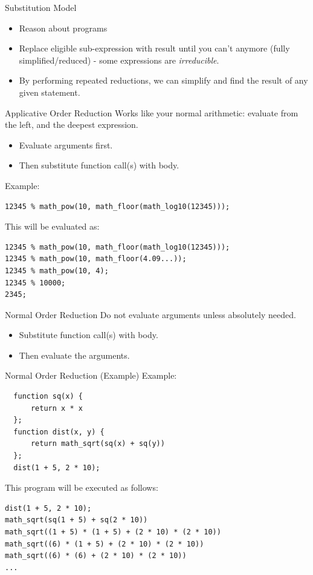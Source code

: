 \documentclass[10pt]{beamer}
\begin{document}
\begin{frame}[fragile]{Substitution Model}
  \begin{itemize}
    \item Reason about programs
    \item Replace eligible sub-expression with result until you can't anymore (fully simplified/reduced) - some expressions are \textit{irreducible}.
    \item By performing repeated reductions, we can simplify and find the result of any given statement.
  \end{itemize}  
\end{frame}

\begin{frame}[fragile]{Applicative Order Reduction}
  Works like your normal arithmetic: evaluate from the left, and the deepest expression.
  \begin{itemize}
    \item Evaluate arguments first.
    \item Then substitute function call(s) with body.
  \end{itemize}
  Example:
  \begin{verbatim}      
12345 % math_pow(10, math_floor(math_log10(12345)));
  \end{verbatim}   
  This will be evaluated as:
  \begin{verbatim}
12345 % math_pow(10, math_floor(math_log10(12345)));
12345 % math_pow(10, math_floor(4.09...));
12345 % math_pow(10, 4);
12345 % 10000;
2345;
  \end{verbatim}
\end{frame}

\begin{frame}[fragile]{Normal Order Reduction}
  Do not evaluate arguments unless absolutely needed.
  \begin{itemize}
    \item Substitute function call(s) with body.
    \item Then evaluate the arguments.
  \end{itemize}
\end{frame}

\begin{frame}[fragile]{Normal Order Reduction (Example)}
Example:
  \begin{verbatim}
  function sq(x) { 
      return x * x 
  };
  function dist(x, y) { 
      return math_sqrt(sq(x) + sq(y)) 
  };
  dist(1 + 5, 2 * 10);
  \end{verbatim}

  This program will be executed as follows:
  \begin{verbatim}
dist(1 + 5, 2 * 10);
math_sqrt(sq(1 + 5) + sq(2 * 10))
math_sqrt((1 + 5) * (1 + 5) + (2 * 10) * (2 * 10))
math_sqrt((6) * (1 + 5) + (2 * 10) * (2 * 10))
math_sqrt((6) * (6) + (2 * 10) * (2 * 10))
...
  \end{verbatim}
\end{frame}
\end{document}

